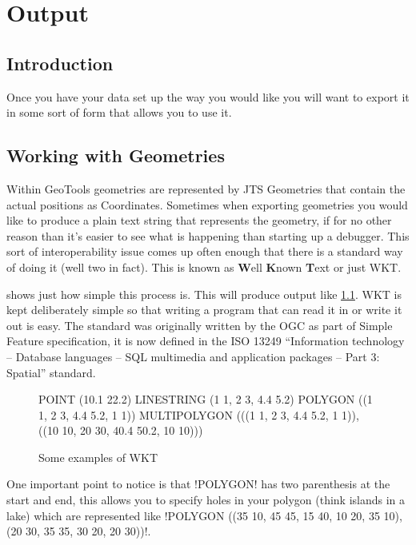 \chapter{Output}

\section{Introduction}
Once you have your data set up the way you would like you will want 
to export it in some sort of form that allows you to use it.

\section{Working with Geometries}\label{geoms}
Within GeoTools geometries are represented by JTS Geometries that contain the actual positions as Coordinates.
Sometimes when exporting geometries you would like to produce a plain text string that represents the geometry, if for no other reason than it's easier to see what is happening than starting up a debugger. 
This sort of interoperability issue comes up often enough that there is a standard way of doing it (well two in fact). This is known as \textbf{W}ell \textbf{K}nown \textbf{T}ext or just WKT.



 shows just how simple this process is. This will produce output like \cref{wktoutput}. WKT is kept deliberately simple so that writing a program that can read it in or write it out is easy. The standard was originally written by the OGC as part of Simple Feature specification, it is now defined in the ISO 13249 ``Information technology -- Database languages -- SQL multimedia and application packages -- Part 3: Spatial'' standard.

\begin{figure}[h]
\begin{spverbatim}
POINT (10.1 22.2) 
LINESTRING (1 1, 2 3, 4.4 5.2)
POLYGON ((1 1, 2 3, 4.4 5.2, 1 1))
MULTIPOLYGON (((1 1, 2 3, 4.4 5.2, 1 1)), ((10 10, 20 30, 40.4 50.2, 10 10)))
\end{spverbatim}
\caption{Some examples of WKT}\label{wktoutput}
\end{figure}

One important point to notice is that \spverb!POLYGON! has two parenthesis at the start and end, this allows you to specify holes in your polygon (think islands in a lake) which are represented like \spverb!POLYGON ((35 10, 45 45, 15 40, 10 20, 35 10),(20 30, 35 35, 30 20, 20 30))!. 

